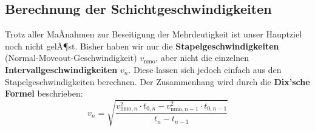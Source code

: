 \subsection{Berechnung der Schichtgeschwindigkeiten}

Trotz aller MaÃnahmen zur Beseitigung der Mehrdeutigkeit ist unser Hauptziel noch nicht gelÃ¶st. Bisher haben wir nur die \textbf{Stapelgeschwindigkeiten} (Normal-Moveout-Geschwindigkeit) $v_{\text{nmo}}$, aber nicht die einzelnen \textbf{Intervallgeschwindigkeiten} $v_n$. Diese lassen sich jedoch einfach aus den Stapelgeschwindigkeiten berechnen. Der Zusammenhang wird durch die \textbf{Dix'sche Formel} beschrieben: \begin{equation*}
	v_n = \sqrt{\frac{v_{\text{nmo},n}^2 \cdot t_{0,n} - v_{\text{nmo},n-1}^2 \cdot t_{0,n-1}}{t_n - t_{n-1}}}
\end{equation*} 

 







